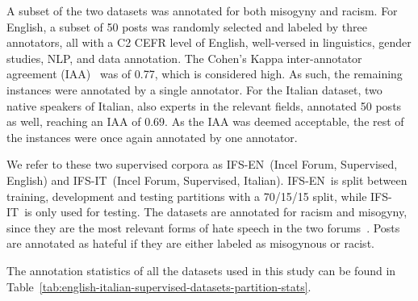 \documentclass[11pt]{article}
\newcommand{\dsENclassification}{IFS-EN}
\newcommand{\dsITclassification}{IFS-IT}
\begin{document}
A subset of the two datasets was annotated for both misogyny and racism.
For English, a subset of 50 posts was randomly selected and labeled by three annotators, all with a C2 CEFR level of English, well-versed in linguistics, gender studies, NLP, and data annotation.
The Cohen's Kappa inter-annotator agreement (IAA)~\cite{bobicev2017inter} was of 0.77, which is considered high.
As such, the remaining instances were annotated by a single annotator. For the Italian dataset, two native speakers of Italian, also experts in the relevant fields, annotated  50 posts as well, reaching an IAA of 0.69. As the IAA was deemed acceptable, the rest of the instances were once again annotated by one annotator.

We refer to these two supervised corpora as \dsENclassification\, (Incel Forum, Supervised, English) and \dsITclassification\, (Incel Forum, Supervised, Italian). \dsENclassification~is split between training, development and testing partitions with a 70/15/15 split, while \dsITclassification~is only used for testing.
The datasets are annotated for racism and misogyny, since they are the most relevant forms of hate speech in the two forums~\cite{silva2016analyzing,ging2018special}. Posts are annotated as hateful if they are either labeled as misogynous or racist.

The annotation statistics of all the datasets used in this study can be found in Table~\ref{tab:english-italian-supervised-datasets-partition-stats}.
\end{document}
